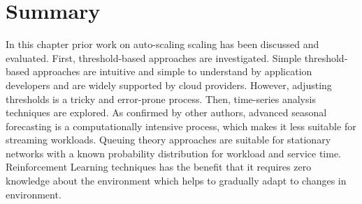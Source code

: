 \section{Summary}
\label{related:con}

In this chapter prior work on auto-scaling scaling has been discussed and evaluated. First, threshold-based approaches are investigated. Simple threshold-based approaches are intuitive and simple to understand by application developers and are widely supported by cloud providers. However, adjusting thresholds is a tricky and error-prone process. Then, time-series analysis techniques are explored. As confirmed by other authors, advanced seasonal forecasting is a computationally intensive process, which makes it less suitable for streaming workloads. Queuing theory approaches are suitable for stationary networks with a known probability distribution for workload and service time. Reinforcement Learning techniques has the benefit that it requires zero knowledge about the environment which helps to gradually adapt to changes in environment.
